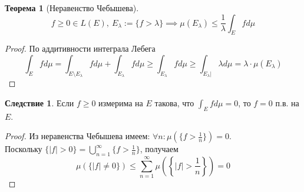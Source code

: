\documentclass[11pt,a4paper]{report}
\theoremstyle{definition}
\theoremstyle{definition}
\newtheorem{theorem}{Теорема}[section]
\newtheorem{corollary}{Следствие}[section]
\theoremstyle{definition}
\begin{document}
	\begin{theorem}[Неравенство Чебышева]
		\[ f \ge 0 \in L(E),\ E_{\lambda} := \{ f > \lambda \} \implies \mu(E_{\lambda}) \le \frac{1}{\lambda} \int_{E} f d\mu \]
	\end{theorem}
	\begin{proof}
		По аддитивности интеграла Лебега
		\[ \int_{E} f d\mu = \int_{E \setminus E_{\lambda}} f d\mu + \int_{E_{\lambda}} f d\mu \ge \int_{E_{\lambda}} f d\mu \ge \int_{E_{\lambda}|} \lambda d\mu = \lambda \cdot \mu(E_{\lambda}) \]
	\end{proof}
	\begin{corollary}
		Если $ f \ge 0 $ измерима на $ E $ такова, что $ \int_{E} f d\mu = 0 $, то $ f = 0 $ п.в. на $ E $.
	\end{corollary}
	\begin{proof}
		Из неравенства Чебышева имеем: $ \forall n: \mu(\{ f > \frac{1}{n} \}) = 0 $.\\
		Поскольку $ \{ |f| > 0 \} = \bigcup\limits_{n=1}^{\infty} \{ f > \frac{1}{n} \} $, получаем
		\[ \mu(\{ |f| \neq 0 \}) \le \sum\limits_{n=1}^{\infty} \mu\left (\left \{ |f| > \frac{1}{n} \right \}\right ) = 0 \]
	\end{proof}
\end{document}
